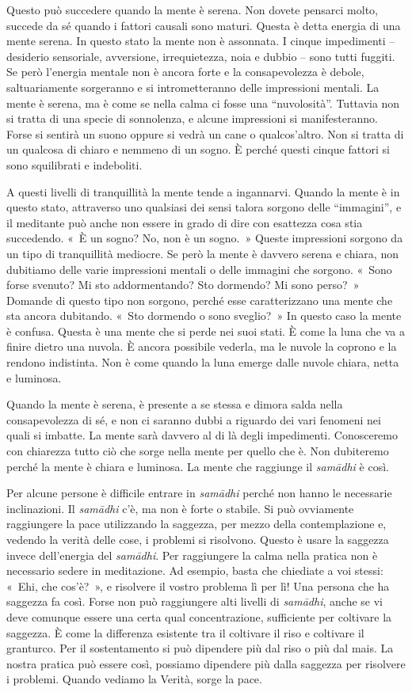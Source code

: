 Questo può succedere quando la mente è serena. Non dovete pensarci
molto, succede da sé quando i fattori causali sono maturi. Questa è
detta energia di una mente serena. In questo stato la mente non è
assonnata. I cinque impedimenti -- desiderio sensoriale, avversione,
irrequietezza, noia e dubbio -- sono tutti fuggiti. Se però l'energia
mentale non è ancora forte e la consapevolezza è debole, saltuariamente
sorgeranno e si intrometteranno delle impressioni mentali. La mente è
serena, ma è come se nella calma ci fosse una ``nuvolosità''. Tuttavia
non si tratta di una specie di sonnolenza, e alcune impressioni si
manifesteranno. Forse si sentirà un suono oppure si vedrà un cane o
qualcos'altro. Non si tratta di un qualcosa di chiaro e nemmeno di un
sogno. È perché questi cinque fattori si sono squilibrati e indeboliti.

A questi livelli di tranquillità la mente tende a ingannarvi. Quando la
mente è in questo stato, attraverso uno qualsiasi dei sensi talora
sorgono delle ``immagini'', e il meditante può anche non essere in grado
di dire con esattezza cosa stia succedendo. «~È un sogno? No, non è un
sogno.~» Queste impressioni sorgono da un tipo di tranquillità mediocre.
Se però la mente è davvero serena e chiara, non dubitiamo delle varie
impressioni mentali o delle immagini che sorgono. «~Sono forse svenuto?
Mi sto addormentando? Sto dormendo? Mi sono perso?~» Domande di questo
tipo non sorgono, perché esse caratterizzano una mente che sta ancora
dubitando. «~Sto dormendo o sono sveglio?~» In questo caso la mente è
confusa. Questa è una mente che si perde nei suoi stati. È come la luna
che va a finire dietro una nuvola. È ancora possibile vederla, ma le
nuvole la coprono e la rendono indistinta. Non è come quando la luna
emerge dalle nuvole chiara, netta e luminosa.

Quando la mente è serena, è presente a se stessa e dimora salda nella
consapevolezza di sé, e non ci saranno dubbi a riguardo dei vari
fenomeni nei quali si imbatte. La mente sarà davvero al di là degli
impedimenti. Conosceremo con chiarezza tutto ciò che sorge nella mente
per quello che è. Non dubiteremo perché la mente è chiara e luminosa. La
mente che raggiunge il \emph{samādhi} è così.

Per alcune persone è difficile entrare in \emph{samādhi} perché non
hanno le necessarie inclinazioni. Il \emph{samādhi} c'è, ma non è forte
o stabile. Si può ovviamente raggiungere la pace utilizzando la
saggezza, per mezzo della contemplazione e, vedendo la verità delle
cose, i problemi si risolvono. Questo è usare la saggezza invece
dell'energia del \emph{samādhi}. Per raggiungere la calma nella pratica
non è necessario sedere in meditazione. Ad esempio, basta che chiediate
a voi stessi: «~Ehi, che cos'è?~», e risolvere il vostro problema lì per
lì! Una persona che ha saggezza fa così. Forse non può raggiungere alti
livelli di \emph{samādhi}, anche se vi deve comunque essere una certa
qual concentrazione, sufficiente per coltivare la saggezza. È come la
differenza esistente tra il coltivare il riso e coltivare il granturco.
Per il sostentamento si può dipendere più dal riso o più dal mais. La
nostra pratica può essere così, possiamo dipendere più dalla saggezza
per risolvere i problemi. Quando vediamo la Verità, sorge la pace.

